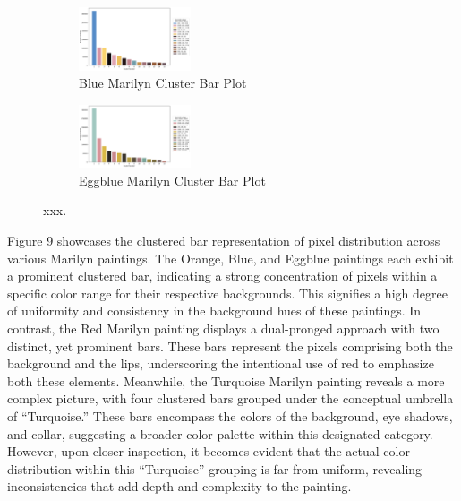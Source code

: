 \documentclass{article}
\begin{document}
\begin{figure}[ht]
  \begin{minipage}{0.6\textwidth}
    \centering
    \begin{subfigure}{0.45\textwidth}
      \centering
      \includegraphics[width=125px]{main_files/figure-latex/6_4_blue_marilyn_cluster_bar_chart.pdf}
      \caption{Blue Marilyn Cluster Bar Plot}
      \label{fig:6_4_orange_marilyn_cluster_bar_chart}
    \end{subfigure}
    \hfill
    \begin{subfigure}{0.45\textwidth}
      \centering
      \includegraphics[width=125px]{main_files/figure-latex/6_5_eggblue_marilyn_cluster_bar_chart.pdf}
      \caption{Eggblue Marilyn Cluster Bar Plot}
      \label{fig:6_5_eggblue_marilyn_cluster_bar_chart}
    \end{subfigure}
  \end{minipage}
  \caption{xxx.}
  \label{fig:marilyn_cluster_bars}
\end{figure}

Figure 9 showcases the clustered bar representation of pixel
distribution across various Marilyn paintings. The Orange, Blue, and
Eggblue paintings each exhibit a prominent clustered bar, indicating a
strong concentration of pixels within a specific color range for their
respective backgrounds. This signifies a high degree of uniformity and
consistency in the background hues of these paintings. In contrast, the
Red Marilyn painting displays a dual-pronged approach with two distinct,
yet prominent bars. These bars represent the pixels comprising both the
background and the lips, underscoring the intentional use of red to
emphasize both these elements. Meanwhile, the Turquoise Marilyn painting
reveals a more complex picture, with four clustered bars grouped under
the conceptual umbrella of ``Turquoise.'' These bars encompass the
colors of the background, eye shadows, and collar, suggesting a broader
color palette within this designated category. However, upon closer
inspection, it becomes evident that the actual color distribution within
this ``Turquoise'' grouping is far from uniform, revealing
inconsistencies that add depth and complexity to the painting.
\end{document}

